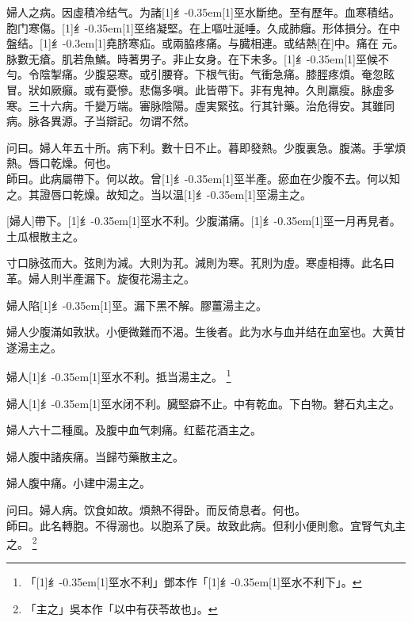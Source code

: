 \documentclass[oneside,b4paper]{ctexbook}
\begin{document}
\begin{flushleft}
婦人之病。因虛積冷结气。为諸{\hbox{\scalebox{0.68}[1]{纟}\kern-0.35em\scalebox{0.64}[1]{巠}}}水斷绝。至有歷年。血寒積结。胞门寒傷。{\hbox{\scalebox{0.68}[1]{纟}\kern-0.35em\scalebox{0.64}[1]{巠}}}络凝堅。在上嘔吐涎唾。久成肺癰。形体損分。在中盤结。{\hbox{\scalebox{0.6}[1]{纟}\kern-0.3em\scalebox{0.63}[1]{堯}}}脐寒疝。或兩脇疼痛。与臓相連。或结熱[在]中。痛在{𬮦}元。脉數无瘡。肌若魚鱗。時著男子。非止女身。在下未多。{\hbox{\scalebox{0.68}[1]{纟}\kern-0.35em\scalebox{0.64}[1]{巠}}}候不勻。令陰掣痛。少腹惡寒。或引腰脊。下根气街。气衝急痛。膝脛疼煩。奄忽眩冒。狀如厥癲。或有憂慘。悲傷多嗔。此皆帶下。非有鬼神。久則羸瘦。脉虛多寒。三十六病。千變万端。審脉陰陽。虛実緊弦。行其针藥。治危得安。其雖同病。脉各異源。子当辯記。勿谓不然。

问曰。婦人年五十所。病下利。數十日不止。暮即發熱。少腹裏急。腹滿。手掌煩熱。唇口乾燥。何也。\\
師曰。此病屬帶下。何以故。曾{\hbox{\scalebox{0.68}[1]{纟}\kern-0.35em\scalebox{0.64}[1]{巠}}}半產。瘀血在少腹不去。何以知之。其證唇口乾燥。故知之。当以温{\hbox{\scalebox{0.68}[1]{纟}\kern-0.35em\scalebox{0.64}[1]{巠}}}湯主之。

[婦人]帶下。{\hbox{\scalebox{0.68}[1]{纟}\kern-0.35em\scalebox{0.64}[1]{巠}}}水不利。少腹滿痛。{\hbox{\scalebox{0.68}[1]{纟}\kern-0.35em\scalebox{0.64}[1]{巠}}}一月再見者。土瓜根散主之。

寸口脉弦而大。弦則为減。大則为芤。減則为寒。芤則为虛。寒虛相摶。此名曰革。婦人則半產漏下。旋復花湯主之。

婦人陷{\hbox{\scalebox{0.68}[1]{纟}\kern-0.35em\scalebox{0.64}[1]{巠}}}。漏下黑不解。膠薑湯主之。

婦人少腹滿如敦狀。小便微難而不渴。生後者。此为水与血并结在血室也。大黄甘遂湯主之。

婦人{\hbox{\scalebox{0.68}[1]{纟}\kern-0.35em\scalebox{0.64}[1]{巠}}}水不利。抵当湯主之。
\footnote{「{\hbox{\scalebox{0.68}[1]{纟}\kern-0.35em\scalebox{0.64}[1]{巠}}}水不利」鄧本作「{\hbox{\scalebox{0.68}[1]{纟}\kern-0.35em\scalebox{0.64}[1]{巠}}}水不利下」。}

婦人{\hbox{\scalebox{0.68}[1]{纟}\kern-0.35em\scalebox{0.64}[1]{巠}}}水闭不利。臓堅癖不止。中有乾血。下白物。礬石丸主之。

婦人六十二種風。及腹中血气刺痛。红藍花酒主之。

婦人腹中諸疾痛。当歸芍藥散主之。

婦人腹中痛。小建中湯主之。

问曰。婦人病。饮食如故。煩熱不得卧。而反倚息者。何也。\\
師曰。此名轉胞。不得溺也。以胞系了戾。故致此病。但利小便則愈。宜腎气丸主之。
\footnote{「主之」吳本作「以中有茯苓故也」。}


\end{flushleft}
\end{document}
